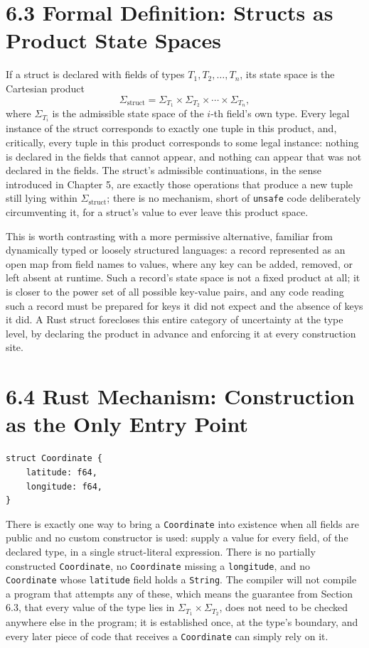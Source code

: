 \documentclass[11pt]{book}
\begin{document}
\section*{6.3 Formal Definition: Structs as Product State Spaces}

If a struct is declared with fields of types $T_1, T_2, \ldots, T_n$, its state space is the Cartesian product
\[
\Sigma_{\text{struct}} = \Sigma_{T_1} \times \Sigma_{T_2} \times \cdots \times \Sigma_{T_n},
\]
where $\Sigma_{T_i}$ is the admissible state space of the $i$-th field's own type. Every legal instance of the struct corresponds to exactly one tuple in this product, and, critically, every tuple in this product corresponds to some legal instance: nothing is declared in the fields that cannot appear, and nothing can appear that was not declared in the fields. The struct's admissible continuations, in the sense introduced in Chapter 5, are exactly those operations that produce a new tuple still lying within $\Sigma_{\text{struct}}$; there is no mechanism, short of \texttt{unsafe} code deliberately circumventing it, for a struct's value to ever leave this product space.

This is worth contrasting with a more permissive alternative, familiar from dynamically typed or loosely structured languages: a record represented as an open map from field names to values, where any key can be added, removed, or left absent at runtime. Such a record's state space is not a fixed product at all; it is closer to the power set of all possible key-value pairs, and any code reading such a record must be prepared for keys it did not expect and the absence of keys it did. A Rust struct forecloses this entire category of uncertainty at the type level, by declaring the product in advance and enforcing it at every construction site.

\section*{6.4 Rust Mechanism: Construction as the Only Entry Point}

\begin{lstlisting}
struct Coordinate {
    latitude: f64,
    longitude: f64,
}
\end{lstlisting}

There is exactly one way to bring a \texttt{Coordinate} into existence when all fields are public and no custom constructor is used: supply a value for every field, of the declared type, in a single struct-literal expression. There is no partially constructed \texttt{Coordinate}, no \texttt{Coordinate} missing a \texttt{longitude}, and no \texttt{Coordinate} whose \texttt{latitude} field holds a \texttt{String}. The compiler will not compile a program that attempts any of these, which means the guarantee from Section 6.3, that every value of the type lies in $\Sigma_{T_1} \times \Sigma_{T_2}$, does not need to be checked anywhere else in the program; it is established once, at the type's boundary, and every later piece of code that receives a \texttt{Coordinate} can simply rely on it.
\end{document}
